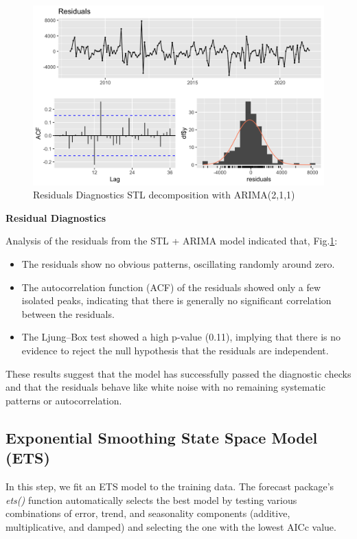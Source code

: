 \begin{figure}[H]
    \centering
    \includegraphics[width=1\linewidth]{images/st_red.png}
    \caption{Residuals Diagnostics STL decomposition with ARIMA(2,1,1)}
    \label{fig:st_red}
\end{figure}

 \noindent\textbf{Residual Diagnostics}

Analysis of the residuals from the STL + ARIMA model indicated that, Fig.\ref{fig:st_red}:
\begin{itemize}
    \item The residuals show no obvious patterns, oscillating randomly around zero.
    \item The autocorrelation function (ACF) of the residuals showed only a few isolated peaks, indicating that there is generally no significant correlation between the residuals.
    \item The Ljung–Box test showed a high p-value (0.11), implying that there is no evidence to reject the null hypothesis that the residuals are independent.
\end{itemize}

These results suggest that the model has successfully passed the diagnostic checks and that the residuals behave like white noise with no remaining systematic patterns or autocorrelation.

\subsection{Exponential Smoothing State Space Model (ETS)}

In this step, we fit an ETS model to the training data. The forecast package's \textit{ets()} function automatically selects the best model by testing various combinations of error, trend, and seasonality components (additive, multiplicative, and damped) and selecting the one with the lowest AICc value.

